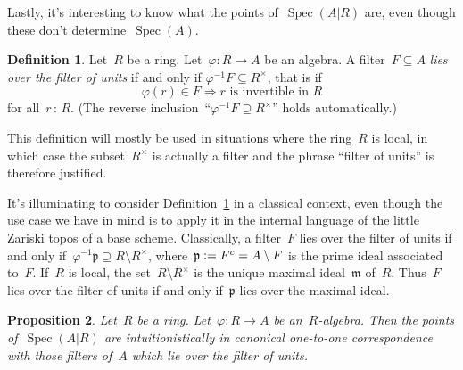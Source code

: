\documentclass[10pt,reqno,a4paper]{amsbook}
\theoremstyle{definition}
\newtheorem{defn}{Definition}[section]
\theoremstyle{plain}
\newtheorem{prop}[defn]{Proposition}
\theoremstyle{remark}
\newcommand{\ppp}{\mathfrak{p}}
\newcommand{\mmm}{\mathfrak{m}}
\DeclareMathOperator{\Spec}{Spec}
\newcommand{\?}{\,{:}\,}
\renewcommand{\_}{\mathpunct{.}\,}
\newcommand{\defeq}{\vcentcolon=}
\begin{document}
Lastly, it's interesting to know what the points of~$\Spec(A|R)$ are, even though these
don't determine~$\Spec(A)$.

\begin{defn}\label{defn:over-the-filter-of-units}
Let~$R$ be a ring. Let~$\varphi : R \to A$ be an algebra. A
filter~$F \subseteq A$ \emph{lies over the filter of units} if and only if
$\varphi^{-1}F \subseteq R^\times$, that is if
\[ \varphi(r) \in F \Longrightarrow \text{$r$ is invertible in $R$} \]
for all~$r \? R$. (The reverse inclusion~``$\varphi^{-1}F \supseteq R^\times$''
holds automatically.)\end{defn}

This definition will mostly be used in situations where the ring~$R$ is local,
in which case the subset~$R^\times$ is actually a filter and the phrase
``filter of units'' is therefore justified.

It's illuminating to consider Definition~\ref{defn:over-the-filter-of-units} in
a classical context, even though the use case we have in mind is to apply it in
the internal language of the little Zariski topos of a base scheme.
Classically, a filter~$F$ lies over the filter of units if and only
if~$\varphi^{-1}\ppp \supseteq R \setminus R^\times$, where~$\ppp \defeq
F^c = A \setminus F$ is the prime ideal associated to~$F$. If~$R$ is local, the
set~$R \setminus R^\times$ is the unique maximal ideal~$\mmm$ of~$R$. Thus~$F$
lies over the filter of units if and only if~$\ppp$ lies over the maximal
ideal.

\begin{prop}Let~$R$ be a ring. Let~$\varphi : R \to A$ be an~$R$-algebra. Then
the points of~$\Spec(A|R)$ are intuitionistically in canonical one-to-one
correspondence with those filters of~$A$ which lie over the filter of units.
\end{prop}
\end{document}
